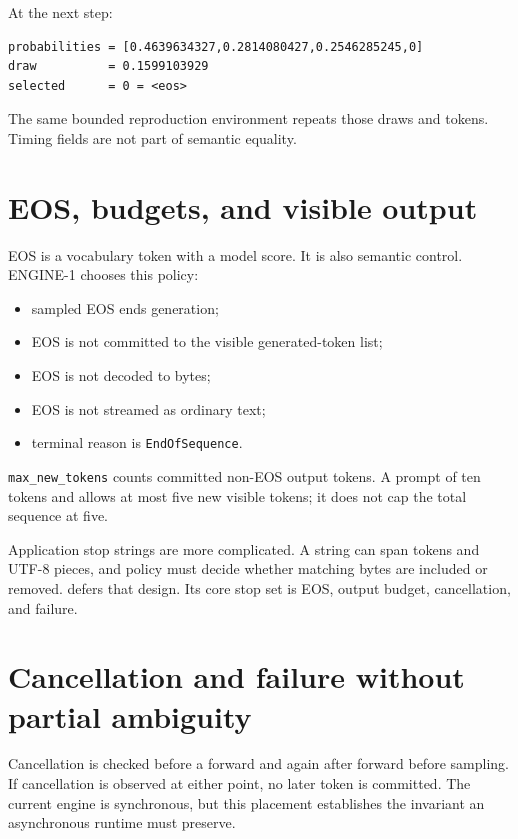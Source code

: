 At the next step:

\begin{verbatim}
probabilities = [0.4639634327,0.2814080427,0.2546285245,0]
draw          = 0.1599103929
selected      = 0 = <eos>
\end{verbatim}

The same bounded reproduction environment repeats those draws and
tokens. Timing fields are not part of semantic equality.

\section{EOS, budgets, and visible
output}\label{eos-budgets-and-visible-output}

EOS is a vocabulary token with a model score. It is also semantic
control. ENGINE-1 chooses this policy:

\begin{itemize}
\tightlist
\item
  sampled EOS ends generation;
\item
  EOS is not committed to the visible generated-token list;
\item
  EOS is not decoded to bytes;
\item
  EOS is not streamed as ordinary text;
\item
  terminal reason is \texttt{EndOfSequence}.
\end{itemize}

\texttt{max\_new\_tokens} counts committed non-EOS output tokens. A
prompt of ten tokens and \texttt{} allows
at most five new visible tokens; it does not cap the total sequence at
five.

Application stop strings are more complicated. A string can span tokens
and UTF-8 pieces, and policy must decide whether matching bytes are
included or removed.  defers that design. Its core stop set is
EOS, output budget, cancellation, and failure.

\section{Cancellation and failure without partial
ambiguity}\label{cancellation-and-failure-without-partial-ambiguity}

Cancellation is checked before a forward and again after forward before
sampling. If cancellation is observed at either point, no later token is
committed. The current engine is synchronous, but this placement
establishes the invariant an asynchronous runtime must preserve.

